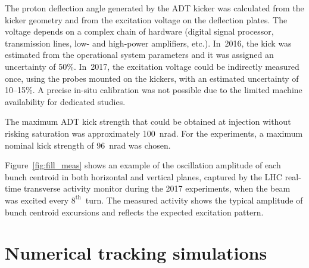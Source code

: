 \documentclass[%
 reprint,
 amsmath,amssymb,
 aps,
prstab,
longbibliography
]{revtex4-1}
\begin{document}
The proton deflection angle generated by the ADT kicker was calculated
from the kicker geometry and from the excitation voltage on the
deflection plates. The voltage depends on a complex chain of hardware
(digital signal processor, transmission lines, low- and high-power
amplifiers, etc.). In~2016, the kick was estimated from the
operational system parameters and it was assigned an uncertainty of
50\%. In~2017, the excitation voltage could be indirectly measured
once, using the probes mounted on the kickers, with an estimated
uncertainty of 10--15\%. A precise in-situ calibration was not
possible due to the limited machine availability for dedicated
studies.

The maximum ADT kick strength that could be obtained at injection
without risking saturation was approximately 100~nrad. For the
experiments, a maximum nominal kick strength of 96~nrad was chosen.

Figure~\ref{fig:fill_meas} shows an example of the oscillation
amplitude of each bunch centroid in both horizontal and vertical
planes, captured by the LHC real-time transverse activity monitor
during the 2017 experiments, when the beam was excited every
$8^{\mathrm{th}}$~turn. The measured activity shows the typical
amplitude of bunch centroid excursions and reflects the expected
excitation pattern.



\section{Numerical tracking simulations}
\label{sec:sim}
\end{document}
